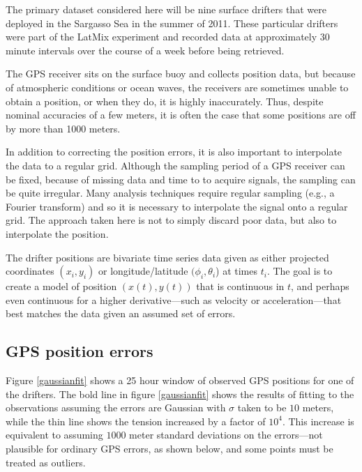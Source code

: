 \documentclass[10pt,journal]{IEEEtran}
\begin{document}
The primary dataset considered here will be nine surface drifters that were deployed in the Sargasso Sea in the summer of 2011. These particular drifters were part of the LatMix experiment \cite{shcherbina2015-bams} and recorded data at approximately 30 minute intervals over the course of a week before being retrieved.

The GPS receiver sits on the surface buoy and collects position data, but because of atmospheric conditions or ocean waves, the receivers are sometimes unable to obtain a position, or when they do, it is highly inaccurately. Thus, despite nominal accuracies of a few meters, it is often the case that some positions are off by more than 1000 meters.

In addition to correcting the position errors, it is also important to interpolate the data to a regular grid. Although the sampling period of a GPS receiver can be fixed, because of missing data and time to to acquire signals, the sampling can be quite irregular.  Many analysis techniques require regular sampling (e.g., a Fourier transform) and so it is necessary to interpolate the signal onto a regular grid. The approach taken here is not to simply discard poor data, but also to interpolate the position.



The drifter positions are bivariate time series data given as either projected coordinates $(x_i, y_i)$ or longitude/latitude $(\phi_i, \theta_i$) at times $t_i$. The goal is to create a model of position $(x(t),y(t))$ that is continuous in $t$, and perhaps even continuous for a higher derivative---such as velocity or acceleration---that best matches the data given an assumed set of errors.
\subsection{GPS position errors}
\label{gps_position_errors}

Figure \ref{gaussianfit} shows a 25 hour window of observed GPS positions for one of the drifters. The bold line in figure \ref{gaussianfit} shows the results of fitting to the observations assuming the errors are Gaussian with $\sigma$ taken to be $10$ meters, while the thin line shows the tension increased by a factor of $10^4$. This increase is equivalent to assuming $1000$ meter standard deviations on the errors---not plausible for ordinary GPS errors, as shown below, and some points must be treated as outliers. 
\end{document}
